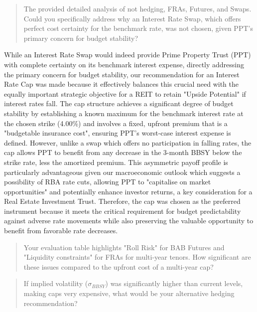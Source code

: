 \documentclass[11pt, a4paper, british]{article}
\begin{document}
\newpage

\begin{quote}
    The  provided detailed analysis of not hedging, FRAs, Futures, and Swaps. Could you specifically address why an Interest Rate Swap, which offers perfect cost certainty for the benchmark rate, was not chosen, given PPT's primary concern for budget stability?
\end{quote}

While an Interest Rate Swap would indeed provide Prime Property Trust (PPT) with complete certainty on its benchmark interest expense, directly addressing the primary concern for budget stability, our recommendation for an Interest Rate Cap was made because it effectively balances this crucial need with the equally important strategic objective for a REIT to retain "Upside Potential" if interest rates fall. The cap structure achieves a significant degree of budget stability by establishing a known maximum for the benchmark interest rate at the chosen strike (4.00\%) and involves a fixed, upfront premium that is a "budgetable insurance cost", ensuring PPT's worst-case interest expense is defined. However, unlike a swap which offers no participation in falling rates, the cap allows PPT to benefit from any decrease in the 3-month BBSY below the strike rate, less the amortized premium. This asymmetric payoff profile is particularly advantageous given our macroeconomic outlook which suggests a possibility of RBA rate cuts, allowing PPT to "capitalise on market opportunities"  and potentially enhance investor returns, a key consideration for a Real Estate Investment Trust. Therefore, the cap was chosen as the preferred instrument because it meets the critical requirement for budget predictability against adverse rate movements while also preserving the valuable opportunity to benefit from favorable rate decreases.

\newpage

\begin{quote}
    Your evaluation table highlights "Roll Risk" for BAB Futures and "Liquidity constraints" for FRAs for multi-year tenors. How significant are these issues compared to the upfront cost of a multi-year cap?
\end{quote}

\newpage

\begin{quote}
    If implied volatility ($\sigma_{BBSY}$) was significantly higher than current levels, making caps very expensive, what would be your alternative hedging recommendation?
\end{quote}
\end{document}
